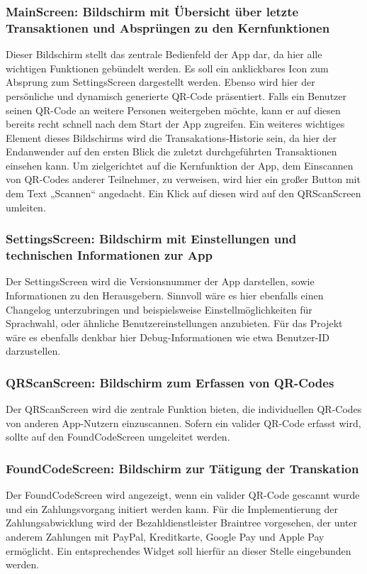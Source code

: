   \subsubsection*{MainScreen: Bildschirm mit Übersicht über letzte Transaktionen und Absprüngen zu den Kernfunktionen}
  Dieser Bildschirm stellt das zentrale Bedienfeld der App dar, da hier alle wichtigen Funktionen gebündelt werden.
  Es soll ein anklickbares Icon zum Absprung zum SettingsScreen dargestellt werden.
  Ebenso wird hier der persönliche und dynamisch generierte QR-Code präsentiert.
  Falls ein Benutzer seinen QR-Code an weitere Personen weitergeben möchte, kann er auf diesen bereits recht schnell nach dem Start der App zugreifen.
  Ein weiteres wichtiges Element dieses Bildschirms wird die Transakations-Historie sein, da hier der Endanwender auf den ersten Blick die zuletzt durchgeführten Transaktionen einsehen kann.
  Um zielgerichtet auf die Kernfunktion der App, dem Einscannen von QR-Codes anderer Teilnehmer, zu verweisen, wird hier ein großer Button mit dem Text „Scannen“ angedacht.
  Ein Klick auf diesen wird auf den QRScanScreen umleiten.
  \subsubsection*{SettingsScreen: Bildschirm mit Einstellungen und technischen Informationen zur App}
  Der SettingsScreen wird die Versionsnummer der App darstellen, sowie Informationen zu den Herausgebern. Sinnvoll wäre es hier ebenfalls einen Changelog unterzubringen und beispielsweise Einstellmöglichkeiten für Sprachwahl, oder ähnliche Benutzereinstellungen anzubieten. Für das Projekt wäre es ebenfalls denkbar hier Debug-Informationen wie etwa Benutzer-ID darzustellen.
  \subsubsection*{QRScanScreen: Bildschirm zum Erfassen von QR-Codes}
  Der QRScanScreen wird die zentrale Funktion bieten, die individuellen QR-Codes von anderen App-Nutzern einzuscannen.
  Sofern ein valider QR-Code erfasst wird, sollte auf den FoundCodeScreen umgeleitet werden.
  \subsubsection*{FoundCodeScreen: Bildschirm zur Tätigung der Transkation}
  Der FoundCodeScreen wird angezeigt, wenn ein valider QR-Code gescannt wurde und ein Zahlungsvorgang initiert werden kann.
  Für die Implementierung der Zahlungsabwicklung wird der Bezahldienstleister Braintree vorgesehen, der unter anderem Zahlungen mit PayPal, Kreditkarte, Google Pay und Apple Pay ermöglicht.
  Ein entsprechendes Widget soll hierfür an dieser Stelle eingebunden werden.
